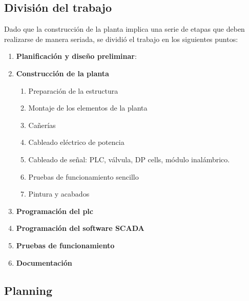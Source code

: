 \subsection{División del trabajo}
Dado que la construcción de la planta implica una serie de etapas que
deben realizarse de manera seriada, se dividió el trabajo en los siguientes puntos:
\begin{enumerate}
 \item \textbf{Planificación y diseño preliminar}:
  \item \textbf{Construcción de la planta}
  \begin{enumerate}
   \item Preparación de la estructura
   \item Montaje de los elementos de la planta
   \item Cañerías
   \item Cableado eléctrico de potencia
   \item Cableado de señal: PLC, válvula, DP cells, módulo inalámbrico.
   \item Pruebas de funcionamiento sencillo
   \item Pintura y acabados
  \end{enumerate}
  \item \textbf{Programación del \gls{plc}}
  \item \textbf{Programación del software SCADA}
  \item \textbf{Pruebas de funcionamiento}
  \item \textbf{Documentación}
\end{enumerate}

\subsection{Planning}
